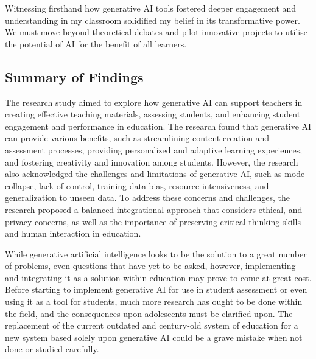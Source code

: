 \documentclass[a4paper,12pt]{report}
\begin{document}
Witnessing firsthand how generative AI tools fostered deeper engagement and understanding in my classroom solidified my belief in its transformative power. We must move beyond theoretical debates and pilot innovative projects to utilise the potential of AI for the benefit of all learners.

\subsection{Summary of Findings} \label{subs:summary-findings}
The research study aimed to explore how generative AI can support teachers in creating effective teaching materials, assessing students, and enhancing student engagement and performance in education. The research found that generative AI can provide various benefits, such as streamlining content creation and assessment processes, providing personalized and adaptive learning experiences, and fostering creativity and innovation among students. However, the research also acknowledged the challenges and limitations of generative AI, such as mode collapse, lack of control, training data bias, resource intensiveness, and generalization to unseen data. To address these concerns and challenges, the research proposed a balanced integrational approach that considers ethical, and privacy concerns, as well as the importance of preserving critical thinking skills and human interaction in education.

While generative artificial intelligence looks to be the solution to a great number of problems, even questions that have yet to be asked, however, implementing and integrating it as a solution within education may prove to come at great cost. Before starting to implement generative AI for use in student assessment or even using it as a tool for students, much more research has ought to be done within the field, and the consequences upon adolescents must be clarified upon. The replacement of the current outdated and century-old system of education for a new system based solely upon generative AI could be a grave mistake when not done or studied carefully.

\newpage
\end{document}
